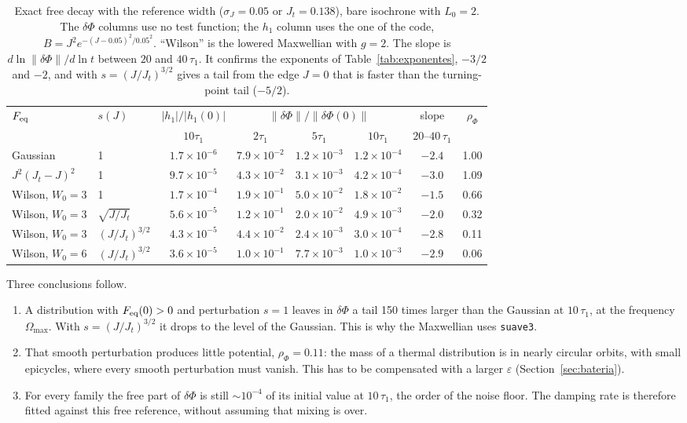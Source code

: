 \documentclass[11pt,a4paper]{article}
\begin{document}
\begin{table}[!htbp]
\centering
\small
\setlength{\tabcolsep}{3.6pt}
\begin{tabular}{llcccccc}
\toprule
$F_{\rm eq}$ & $s(J)$ & $|h_1|/|h_1(0)|$ &
  \multicolumn{3}{c}{$\|\delta\Phi\|/\|\delta\Phi(0)\|$} & slope &
  $\rho_\Phi$\\
 & & $10\tau_1$ & $2\tau_1$ & $5\tau_1$ & $10\tau_1$ & $20$--$40\,\tau_1$ & \\
\midrule
Gaussian & 1 &
  $1.7\times10^{-6}$ & $7.9\times10^{-2}$ & $1.2\times10^{-3}$ & $1.2\times10^{-4}$ & $-2.4$ & 1.00\\
$J^2(J_t-J)^2$ & 1 &
  $9.7\times10^{-5}$ & $4.3\times10^{-2}$ & $3.1\times10^{-3}$ & $4.2\times10^{-4}$ & $-3.0$ & 1.09\\
Wilson, $W_0=3$ & 1 &
  $1.7\times10^{-4}$ & $1.9\times10^{-1}$ & $5.0\times10^{-2}$ & $1.8\times10^{-2}$ & $-1.5$ & 0.66\\
Wilson, $W_0=3$ & $\sqrt{J/J_t}$ &
  $5.6\times10^{-5}$ & $1.2\times10^{-1}$ & $2.0\times10^{-2}$ & $4.9\times10^{-3}$ & $-2.0$ & 0.32\\
Wilson, $W_0=3$ & $(J/J_t)^{3/2}$ &
  $4.3\times10^{-5}$ & $4.4\times10^{-2}$ & $2.4\times10^{-3}$ & $3.0\times10^{-4}$ & $-2.8$ & 0.11\\
Wilson, $W_0=6$ & $(J/J_t)^{3/2}$ &
  $3.6\times10^{-5}$ & $1.0\times10^{-1}$ & $7.7\times10^{-3}$ & $1.0\times10^{-3}$ & $-2.9$ & 0.06\\
\bottomrule
\end{tabular}
\caption{Exact free decay with the reference width ($\sigma_J=0.05$ or $J_t=0.138$), bare
isochrone with $L_0=2$. The $\delta\Phi$ columns use no test function; the $h_1$ column uses the
one of the code, $B=J^2e^{-(J-0.05)^2/0.05^2}$. ``Wilson'' is the lowered Maxwellian with $g=2$.
The slope is $d\ln\|\delta\Phi\|/d\ln t$ between $20$ and $40\,\tau_1$. It confirms the exponents of
Table~\ref{tab:exponentes}, $-3/2$ and $-2$, and with $s=(J/J_t)^{3/2}$ gives a tail from the
edge $J=0$ that is faster than the turning-point tail ($-5/2$).}
\label{tab:colas}
\end{table}

Three conclusions follow.
\begin{enumerate}
\item A distribution with $F_{\rm eq}(0)>0$ and perturbation $s=1$ leaves in $\delta\Phi$ a tail 150
times larger than the Gaussian at $10\,\tau_1$, at the frequency $\Omega_{\max}$. With
$s=(J/J_t)^{3/2}$ it drops to the level of the Gaussian. This is why the Maxwellian uses
\texttt{suave3}.
\item That smooth perturbation produces little potential, $\rho_\Phi=0.11$: the mass of a
thermal distribution is in nearly circular orbits, with small epicycles, where every
smooth perturbation must vanish. This has to be compensated with a larger $\varepsilon$
(Section~\ref{sec:bateria}).
\item For every family the free part of $\delta\Phi$ is still $\sim10^{-4}$ of its initial value
at $10\,\tau_1$, the order of the noise floor. The damping rate is therefore fitted against
this free reference, without assuming that mixing is over.
\end{enumerate}
\end{document}
